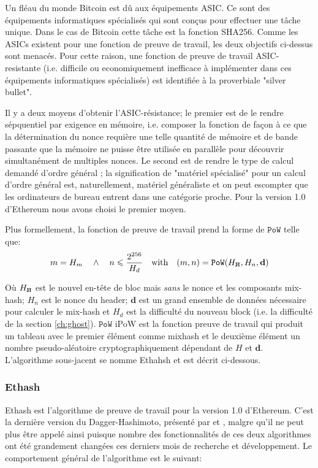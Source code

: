 \documentclass[9pt,oneside]{amsart}
\newcommand{\hcancel}[1]{%
    \tikz[baseline=(tocancel.base)]{
        \node[inner sep=0pt,outer sep=0pt] (tocancel) {#1};
        \draw[black] (tocancel.south west) -- (tocancel.north east);
    }%
}%
\begin{document}
\begin{multicols}{2}
Un fléau du monde Bitcoin est dû aux équipements ASIC. Ce sont des équipements informatiques spécialisés qui sont conçus pour effectuer une tâche unique. Dans le cas de Bitcoin cette tâche est la fonction SHA256. Comme les ASICs existent pour une fonction de preuve de travail, les deux objectifs ci-dessus sont menacés. Pour cette raison, une fonction de preuve de travail ASIC-resistante (i.e. difficile ou economiquement inefficace à implémenter dans ces équipements informatiques spécialisés) est identifiée à la proverbiale "silver bullet".

Il y a deux moyens d'obtenir l'ASIC-résistance; le premier est de le rendre sépquentiel par exigence en mémoire, i.e. composer la fonction de façon à ce que la détermination du nonce requière une telle quantité de mémoire et de bande passante que la mémoire ne puisse être utilisée en parallèle pour découvrir simultanément de multiples nonces. Le second est de rendre le type de calcul demandé d'ordre général ; la signification de "matériel spécialisé" pour un calcul d'ordre général est, naturellement, matériel généraliste et on peut escompter que les ordinateurs de bureau entrent dans une catégorie proche. Pour la version 1.0 d'Ethereum nous avons choisi le premier moyen.

Plus formellement, la fonction de preuve de travail prend la forme de $\mathtt{PoW}$ telle que:
\begin{equation}
m = H_m \quad \wedge \quad n \leqslant \frac{2^{256}}{H_d} \quad \text{with} \quad (m, n) = \mathtt{PoW}(H_{\hcancel{n}}, H_n, \mathbf{d})
\end{equation}

Où $H_{\hcancel{n}}$ est le nouvel en-tête de bloc mais \textit{sans} le nonce et les composants mix-hash; $H_n$ est le nonce du header; $\mathbf{d}$ est un grand ensemble de données nécessaire pour calculer le mix-hash et $H_d$ est la difficulté du nouveau block (i.e. la difficulté de la section \ref{ch:ghost}). $\mathtt{PoW}$ iPoW est la fonction preuve de travail qui produit un tableau avec le premier élément comme mixhash et le deuxième élément un nombre pseudo-aléatoire cryptographiquement dépendant de $H$ et $\mathbf{d}$. L'algorithme sous-jacent se nomme Ethahsh et est décrit ci-dessous.

\subsubsection{Ethash}
Ethash est l'algorithme de preuve de travail pour la version 1.0 d'Ethereum. C'est la dernière version du Dagger-Hashimoto, présenté par \cite{dagger} et \cite{hashimoto}, malgre qu'il ne peut plus être appelé ainsi puisque nombre des fonctionnalités de ces deux algorithmes ont été grandement changées ces derniers mois de recherche et développement. Le comportement général de l'algorithme est le suivant: 


\end{multicols}
\end{document}
